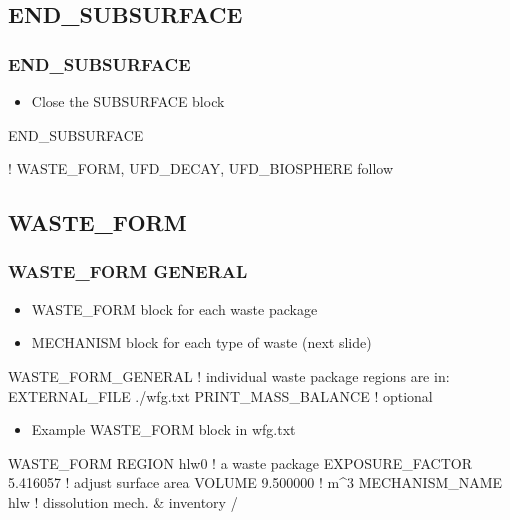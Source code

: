 \documentclass{beamer}
\newcommand\bluecomment[1]{{{\color{blue} #1}}}
\begin{document}
\subsection{END\_SUBSURFACE}
\begin{frame}[fragile]\frametitle{END\_SUBSURFACE}

\begin{itemize}
  \item Close the SUBSURFACE block
\end{itemize}

\begin{semiverbatim}
END_SUBSURFACE 

\bluecomment{! WASTE_FORM, UFD_DECAY, UFD_BIOSPHERE follow}
\end{semiverbatim}
\end{frame}

\subsection{WASTE\_FORM}
\begin{frame}[fragile]\frametitle{WASTE\_FORM GENERAL}

\begin{itemize}
  \item WASTE\_FORM block for each waste package
  \item MECHANISM block for each type of waste (next slide)
\end{itemize}

\begin{semiverbatim}\small
WASTE_FORM_GENERAL
  \bluecomment{! individual waste package regions are in:}
  EXTERNAL_FILE ./wfg.txt
  PRINT_MASS_BALANCE \bluecomment{! optional}
\end{semiverbatim}

\begin{itemize}\small
  \item Example WASTE\_FORM block in wfg.txt
\end{itemize}

\begin{semiverbatim}
  WASTE_FORM
     REGION hlw0 \bluecomment{! a waste package}
     EXPOSURE_FACTOR 5.416057 \bluecomment{! adjust surface area}
     VOLUME 9.500000 \bluecomment{! m^3}
     MECHANISM_NAME hlw \bluecomment{! dissolution mech. & inventory}
  /
\end{semiverbatim}
\end{frame}
\end{document}
